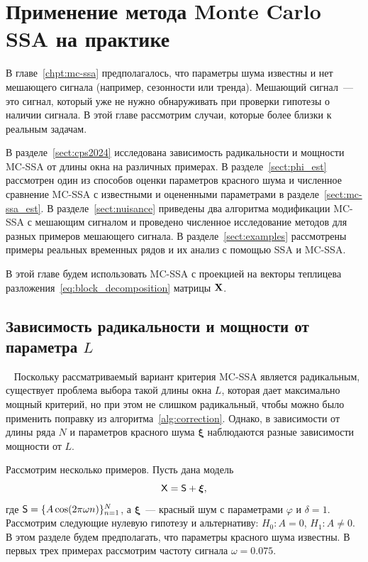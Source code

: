 \documentclass[specialist,
substylefile = spbu.rtx,
               subf,href,colorlinks=true, 12pt]{disser}
\theoremstyle{definition}
\newcommand{\bfxi}{\boldsymbol{\xi}}
\begin{document}
\chapter{Применение метода Monte Carlo SSA на практике}\label{chpt:mc_ssa_real}
В главе~\ref{chpt:mc-ssa} предполагалось, что параметры шума известны и нет мешающего сигнала (например, сезонности или тренда). Мешающий сигнал~--- это сигнал, который уже не нужно обнаруживать при проверки гипотезы о наличии сигнала.  В этой главе рассмотрим случаи, которые более близки к реальным задачам.

В разделе~\ref{sect:cps2024} исследована зависимость радикальности и мощности MC-SSA от длины окна на различных примерах. В разделе~\ref{sect:phi_est} рассмотрен один из способов оценки параметров красного шума и численное сравнение MC-SSA с известными и оцененными параметрами в разделе~\ref{sect:mc-ssa_est}. В разделе~\ref{sect:nuisance} приведены два алгоритма модификации MC-SSA с мешающим сигналом и проведено численное исследование методов для разных примеров мешающего сигнала. В разделе~\ref{sect:examples} рассмотрены примеры реальных временных рядов и их анализ с помощью SSA и MC-SSA.

В этой главе будем использовать MC-SSA с проекцией на векторы теплицева разложения~\eqref{eq:block_decomposition} матрицы $\mathbf{X}$.

\section{Зависимость радикальности и мощности от параметра $L$}~\label{sect:cps2024}
Поскольку рассматриваемый вариант критерия MC-SSA является радикальным, существует проблема выбора такой длины окна $L$, которая дает максимально мощный критерий, но при этом не слишком радикальный, чтобы можно было применить поправку из алгоритма~\ref{alg:correction}. Однако, в зависимости от длины ряда $N$ и параметров красного шума $\bfxi$ наблюдаются разные зависимости мощности от $L$.

Рассмотрим несколько примеров. Пусть дана модель
\[
    \mathsf{X}=\mathsf{S}+{\boldsymbol\xi},
\]
где $\mathsf{S}=\{A\cos(2\pi\omega n)\}_{n=1}^N$, а ${\boldsymbol\xi}$~--- красный шум с параметрами $\varphi$ и $\delta=1$. Рассмотрим следующие нулевую гипотезу и альтернативу: $H_0:A=0$, $H_1:A\ne0$. В этом разделе будем предполагать, что параметры красного шума известны. В первых трех примерах рассмотрим частоту сигнала $\omega = 0.075$.
\end{document}
